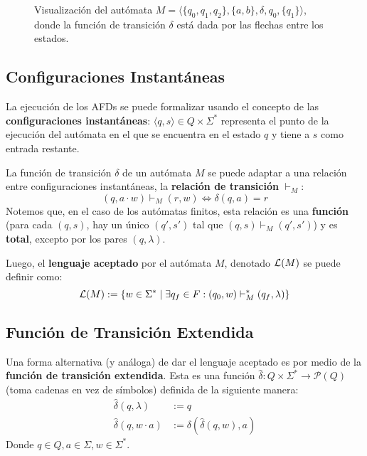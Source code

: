 \begin{figure}[H]
    \centering
    \caption*{Visualización del autómata $M = \langle \{q_0, q_1, q_2\}, \{a, b\}, \delta, q_0, \{q_1\} \rangle$, donde la función de transición $\delta$ está dada por las flechas entre los estados.}
\end{figure}

\subsection{Configuraciones Instantáneas}

La ejecución de los AFDs se puede formalizar usando el concepto de las \textbf{configuraciones instantáneas}: $\langle q, s \rangle \in Q \times \Sigma^*$ representa el punto de la ejecución del autómata en el que se encuentra en el estado $q$ y tiene a $s$ como entrada restante.

La función de transición $\delta$ de un autómata $M$ se puede adaptar a una relación entre configuraciones instantáneas, la \textbf{relación de transición} $\vdash_M$:
$$
(q, a \cdot w) \vdash_M (r, w) \iff \delta(q, a) = r
$$
Notemos que, en el caso de los autómatas finitos, esta relación es una \textbf{función} (para cada $(q, s)$, hay un único $(q', s')$ tal que $(q, s) \vdash_M (q', s')$) y es \textbf{total}, excepto por los pares $(q, \lambda)$.

Luego, el \textbf{lenguaje aceptado} por el autómata $M$, denotado $\mathcal{L}(M)$ se puede definir como:
$$
\mathcal{L}(M) := \{ w \in \Sigma^* \mid \exists q_f \in F : (q_0, w) \vdash_M^* (q_f, \lambda) \}
$$

\subsection{Función de Transición Extendida}

Una forma alternativa (y análoga) de dar el lenguaje aceptado es por medio de la \textbf{función de transición extendida}. Esta es una función $\hat \delta : Q \times \Sigma^* \to \mathcal P (Q)$ (toma cadenas en vez de símbolos) definida de la siguiente manera:
$$
\begin{aligned}
    \hat \delta(q, \lambda) & := q \\
    \hat \delta(q, w \cdot a) & := \delta (\hat \delta (q, w), a)
\end{aligned}
$$
Donde $q \in Q, a \in \Sigma, w \in \Sigma^*$.

